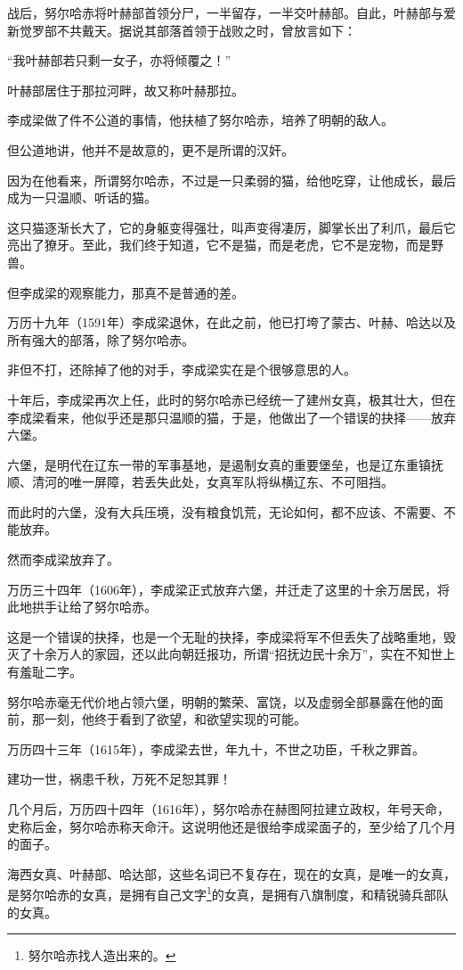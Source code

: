 \begin{multicols}{\theparacolNo}
战后，努尔哈赤将叶赫部首领分尸，一半留存，一半交叶赫部。自此，叶赫部与爱新觉罗部不共戴天。据说其部落首领于战败之时，曾放言如下：

“我叶赫部若只剩一女子，亦将倾覆之！”

叶赫部居住于那拉河畔，故又称叶赫那拉。

李成梁做了件不公道的事情，他扶植了努尔哈赤，培养了明朝的敌人。

但公道地讲，他并不是故意的，更不是所谓的汉奸。

因为在他看来，所谓努尔哈赤，不过是一只柔弱的猫，给他吃穿，让他成长，最后成为一只温顺、听话的猫。

这只猫逐渐长大了，它的身躯变得强壮，叫声变得凄厉，脚掌长出了利爪，最后它亮出了獠牙。至此，我们终于知道，它不是猫，而是老虎，它不是宠物，而是野兽。

但李成梁的观察能力，那真不是普通的差。

万历十九年（1591年）李成梁退休，在此之前，他已打垮了蒙古、叶赫、哈达以及所有强大的部落，除了努尔哈赤。

非但不打，还除掉了他的对手，李成梁实在是个很够意思的人。

十年后，李成梁再次上任，此时的努尔哈赤已经统一了建州女真，极其壮大，但在李成梁看来，他似乎还是那只温顺的猫，于是，他做出了一个错误的抉择——放弃六堡。

六堡，是明代在辽东一带的军事基地，是遏制女真的重要堡垒，也是辽东重镇抚顺、清河的唯一屏障，若丢失此处，女真军队将纵横辽东、不可阻挡。

而此时的六堡，没有大兵压境，没有粮食饥荒，无论如何，都不应该、不需要、不能放弃。

然而李成梁放弃了。

万历三十四年（1606年），李成梁正式放弃六堡，并迁走了这里的十余万居民，将此地拱手让给了努尔哈赤。

这是一个错误的抉择，也是一个无耻的抉择，李成梁将军不但丢失了战略重地，毁灭了十余万人的家园，还以此向朝廷报功，所谓“招抚边民十余万”，实在不知世上有羞耻二字。

努尔哈赤毫无代价地占领六堡，明朝的繁荣、富饶，以及虚弱全部暴露在他的面前，那一刻，他终于看到了欲望，和欲望实现的可能。

万历四十三年（1615年），李成梁去世，年九十，不世之功臣，千秋之罪首。

建功一世，祸患千秋，万死不足恕其罪！

几个月后，万历四十四年（1616年），努尔哈赤在赫图阿拉建立政权，年号天命，史称后金，努尔哈赤称天命汗。这说明他还是很给李成梁面子的，至少给了几个月的面子。

海西女真、叶赫部、哈达部，这些名词已不复存在，现在的女真，是唯一的女真，是努尔哈赤的女真，是拥有自己文字\footnote{努尔哈赤找人造出来的。}的女真，是拥有八旗制度，和精锐骑兵部队的女真。


\end{multicols}
